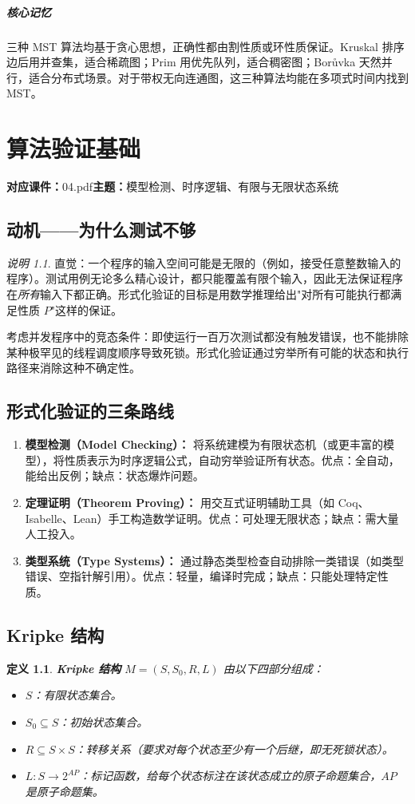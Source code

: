 \documentclass[UTF8,openany,12pt]{ctexbook}
\newtheorem{definition}{定义}[chapter]
\theoremstyle{remark}
\newtheorem{remark}{说明}[chapter]
\newcommand{\lecture}[3]{
  \chapter{#2}
  \noindent\textbf{对应课件：}#1\hfill\textbf{主题：}#3
  \vspace{0.6em}
}
\newcommand{\keypoint}[1]{\paragraph{核心记忆}#1}
\begin{document}
\keypoint{三种 MST 算法均基于贪心思想，正确性都由割性质或环性质保证。Kruskal 排序边后用并查集，适合稀疏图；Prim 用优先队列，适合稠密图；Bor\r{u}vka 天然并行，适合分布式场景。对于带权无向连通图，这三种算法均能在多项式时间内找到 MST。}

\lecture{04.pdf}{算法验证基础}{模型检测、时序逻辑、有限与无限状态系统}

\section{动机——为什么测试不够}

\begin{remark}
直觉：一个程序的输入空间可能是无限的（例如，接受任意整数输入的程序）。测试用例无论多么精心设计，都只能覆盖有限个输入，因此无法保证程序在\emph{所有}输入下都正确。形式化验证的目标是用数学推理给出"对所有可能执行都满足性质 $P$"这样的保证。
\end{remark}

考虑并发程序中的竞态条件：即使运行一百万次测试都没有触发错误，也不能排除某种极罕见的线程调度顺序导致死锁。形式化验证通过穷举所有可能的状态和执行路径来消除这种不确定性。

\section{形式化验证的三条路线}

\begin{enumerate}
  \item \textbf{模型检测（Model Checking）：} 将系统建模为有限状态机（或更丰富的模型），将性质表示为时序逻辑公式，自动穷举验证所有状态。优点：全自动，能给出反例；缺点：状态爆炸问题。
  \item \textbf{定理证明（Theorem Proving）：} 用交互式证明辅助工具（如 Coq、Isabelle、Lean）手工构造数学证明。优点：可处理无限状态；缺点：需大量人工投入。
  \item \textbf{类型系统（Type Systems）：} 通过静态类型检查自动排除一类错误（如类型错误、空指针解引用）。优点：轻量，编译时完成；缺点：只能处理特定性质。
\end{enumerate}

\section{Kripke 结构}

\begin{definition}
\textbf{Kripke 结构} $M = (S, S_0, R, L)$ 由以下四部分组成：
\begin{itemize}
  \item $S$：有限状态集合。
  \item $S_0 \subseteq S$：初始状态集合。
  \item $R \subseteq S \times S$：转移关系（要求对每个状态至少有一个后继，即无死锁状态）。
  \item $L: S \to 2^{AP}$：标记函数，给每个状态标注在该状态成立的原子命题集合，$AP$ 是原子命题集。
\end{itemize}
\end{definition}
\end{document}
